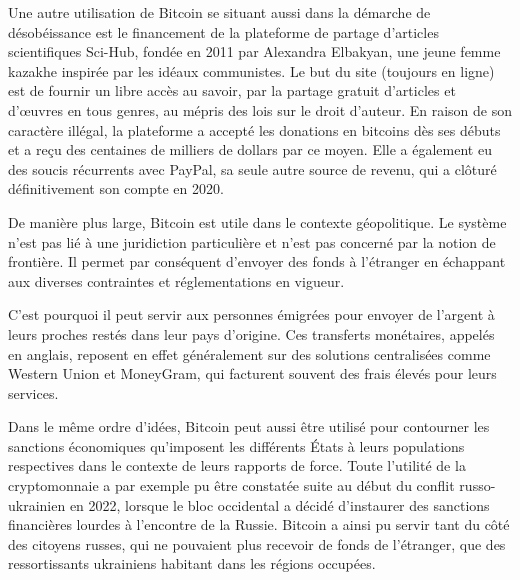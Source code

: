 Une autre utilisation de Bitcoin se situant aussi dans la démarche de désobéissance est le financement de la plateforme de partage d'articles scientifiques Sci-Hub, fondée en 2011 par Alexandra Elbakyan, une jeune femme kazakhe inspirée par les idéaux communistes. Le but du site (toujours en ligne) est de fournir un libre accès au savoir, par la partage gratuit d'articles et d'œuvres en tous genres, au mépris des lois sur le droit d'auteur. En raison de son caractère illégal, la plateforme a accepté les donations en bitcoins dès ses débuts et a reçu des centaines de milliers de dollars par ce moyen. Elle a également eu des soucis récurrents avec PayPal, sa seule autre source de revenu, qui a clôturé définitivement son compte en 2020.


De manière plus large, Bitcoin est utile dans le contexte géopolitique. Le système n'est pas lié à une juridiction particulière et n'est pas concerné par la notion de frontière. Il permet par conséquent d'envoyer des fonds à l'étranger en échappant aux diverses contraintes et réglementations en vigueur.

C'est pourquoi il peut servir aux personnes émigrées pour envoyer de l'argent à leurs proches restés dans leur pays d'origine. Ces transferts monétaires, appelés  en anglais, reposent en effet généralement sur des solutions centralisées comme Western Union et MoneyGram, qui facturent souvent des frais élevés pour leurs services. %

Dans le même ordre d'idées, Bitcoin peut aussi être utilisé pour contourner les sanctions économiques qu'imposent les différents États à leurs populations respectives dans le contexte de leurs rapports de force. Toute l'utilité de la cryptomonnaie a par exemple pu être constatée suite au début du conflit russo-ukrainien en 2022, lorsque le bloc occidental a décidé d'instaurer des sanctions financières lourdes à l'encontre de la Russie. Bitcoin a ainsi pu servir tant du côté des citoyens russes, qui ne pouvaient plus recevoir de fonds de l'étranger, que des ressortissants ukrainiens habitant dans les régions occupées.

